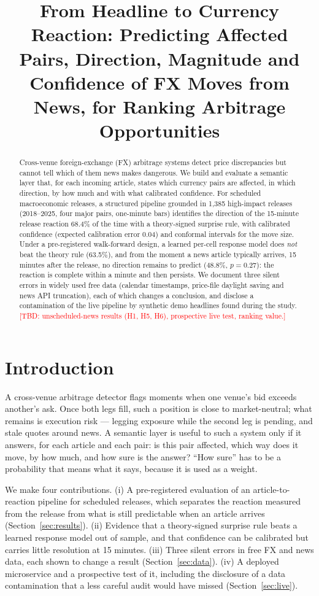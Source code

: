 \documentclass[11pt]{article}
\title{From Headline to Currency Reaction: Predicting Affected Pairs, Direction, Magnitude and
Confidence of FX Moves from News, for Ranking Arbitrage Opportunities}
\author{\tbd{authors}}
\date{\tbd{date}}
\newcommand{\tbd}[1]{\textcolor{red}{[TBD: #1]}}
\begin{document}
\maketitle

\begin{abstract}
Cross-venue foreign-exchange (FX) arbitrage systems detect price discrepancies but cannot tell
which of them news makes dangerous. We build and evaluate a semantic layer that, for each
incoming article, states which currency pairs are affected, in which direction, by how much and
with what calibrated confidence. For scheduled macroeconomic releases, a structured pipeline
grounded in 1,385 high-impact releases (2018--2025, four major pairs, one-minute bars)
identifies the direction of the 15-minute release reaction 68.4\% of the time with a
theory-signed surprise rule, with calibrated confidence (expected calibration error 0.04) and
conformal intervals for the move size. Under a pre-registered walk-forward design, a learned
per-cell response model does \emph{not} beat the theory rule (63.5\%), and from the moment a news
article typically arrives, 15 minutes after the release, no direction remains to predict
(48.8\%, $p=0.27$): the reaction is complete within a minute and then persists. We document three
silent errors in widely used free data (calendar timestamps, price-file daylight saving and news
API truncation), each of which changes a conclusion, and disclose a contamination of the live
pipeline by synthetic demo headlines found during the study. \tbd{unscheduled-news results
(H1, H5, H6), prospective live test, ranking value.}
\end{abstract}

\section{Introduction}

A cross-venue arbitrage detector flags moments when one venue's bid exceeds another's ask. Once
both legs fill, such a position is close to market-neutral; what remains is execution risk ---
legging exposure while the second leg is pending, and stale quotes around news. A semantic layer
is useful to such a system only if it answers, for each article and each pair: is this pair
affected, which way does it move, by how much, and how sure is the answer? ``How sure'' has to be
a probability that means what it says, because it is used as a weight.

We make four contributions.
(i) A pre-registered evaluation of an article-to-reaction pipeline for scheduled releases, which
separates the reaction measured from the release from what is still predictable when an article
arrives (Section~\ref{sec:results}).
(ii) Evidence that a theory-signed surprise rule beats a learned response model out of sample,
and that confidence can be calibrated but carries little resolution at 15 minutes.
(iii) Three silent errors in free FX and news data, each shown to change a result
(Section~\ref{sec:data}).
(iv) A deployed microservice and a prospective test of it, including the disclosure of a data
contamination that a less careful audit would have missed (Section~\ref{sec:live}).
\end{document}
